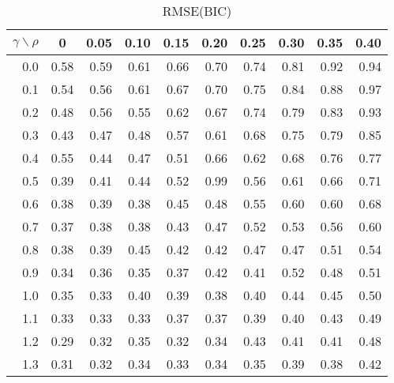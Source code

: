 \documentclass[12pt]{article}
\begin{document}
\begin{table}[!tbp]
\caption{RMSE(BIC)}
 \begin{center}
 \begin{tabular}{r|rrrrrrrrr}\hline\hline
\multicolumn{1}{c|}{$\gamma\backslash\rho$}&\multicolumn{1}{c}{0}&\multicolumn{1}{c}{0.05}&\multicolumn{1}{c}{0.10}&\multicolumn{1}{c}{0.15}&\multicolumn{1}{c}{0.20}&\multicolumn{1}{c}{0.25}&\multicolumn{1}{c}{0.30}&\multicolumn{1}{c}{0.35}&\multicolumn{1}{c}{0.40}\tabularnewline
\hline


0.0&0.58&0.59&0.61&0.66&0.70&0.74&0.81&0.92&0.94\tabularnewline
0.1&0.54&0.56&0.61&0.67&0.70&0.75&0.84&0.88&0.97\tabularnewline
0.2&0.48&0.56&0.55&0.62&0.67&0.74&0.79&0.83&0.93\tabularnewline
0.3&0.43&0.47&0.48&0.57&0.61&0.68&0.75&0.79&0.85\tabularnewline
0.4&0.55&0.44&0.47&0.51&0.66&0.62&0.68&0.76&0.77\tabularnewline
0.5&0.39&0.41&0.44&0.52&0.99&0.56&0.61&0.66&0.71\tabularnewline
0.6&0.38&0.39&0.38&0.45&0.48&0.55&0.60&0.60&0.68\tabularnewline
0.7&0.37&0.38&0.38&0.43&0.47&0.52&0.53&0.56&0.60\tabularnewline
0.8&0.38&0.39&0.45&0.42&0.42&0.47&0.47&0.51&0.54\tabularnewline
0.9&0.34&0.36&0.35&0.37&0.42&0.41&0.52&0.48&0.51\tabularnewline
1.0&0.35&0.33&0.40&0.39&0.38&0.40&0.44&0.45&0.50\tabularnewline
1.1&0.33&0.33&0.33&0.37&0.37&0.39&0.40&0.43&0.49\tabularnewline
1.2&0.29&0.32&0.35&0.32&0.34&0.43&0.41&0.41&0.48\tabularnewline
1.3&0.31&0.32&0.34&0.33&0.34&0.35&0.39&0.38&0.42\tabularnewline
\hline
\end{tabular}

\end{center}

\end{table}

%
\end{document}

